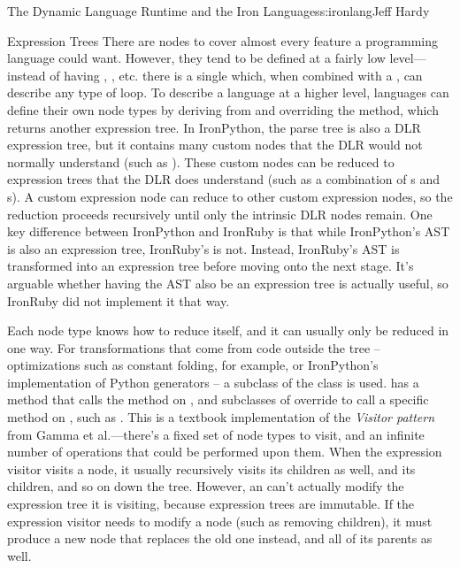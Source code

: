 \begin{aosachapter}{The Dynamic Language Runtime and the Iron Languages}{s:ironlang}{Jeff Hardy}
\begin{aosasect1}{Expression Trees}
There are nodes to cover almost every feature a programming language could
want. However, they tend to be defined at a fairly low level---instead of
having , , etc. there is a single
 which, when combined with a , can
describe any type of loop. To describe a language at a higher level, languages
can define their own node types by deriving from  and
overriding the  method, which returns another expression tree.
In IronPython, the parse tree is also a DLR expression tree, but it contains
many custom nodes that the DLR would not normally understand (such as
). These custom nodes can be reduced to expression trees
that the DLR does understand (such as a combination of s
and s). A custom expression node can reduce to other
custom expression nodes, so the reduction proceeds recursively until only the
intrinsic DLR nodes remain. One key difference between IronPython and IronRuby
is that while IronPython's AST is also an expression tree, IronRuby's is not.
Instead, IronRuby's AST is transformed into an expression tree before moving
onto the next stage. It's arguable whether having the AST also be an expression
tree is actually useful, so IronRuby did not implement it that way.

Each node type knows how to reduce itself, and it can usually only be reduced
in one way. For transformations that come from code outside the tree --
optimizations such as constant folding, for example, or IronPython's
implementation of Python generators -- a subclass of the
 class is used.  has a
 method that calls the  method on
, and subclasses of  override 
to call a specific  method on , such as
. This is a textbook implementation of the \emph{Visitor
pattern} from Gamma et al.---there's a fixed set of node types to visit, and an
infinite number of operations that could be performed upon them. When the
expression visitor visits a node, it usually recursively visits its children as
well, and its children, and so on down the tree. However, an
 can't actually modify the expression tree it is
visiting, because expression trees are immutable. If the expression visitor
needs to modify a node (such as removing children), it must produce a new node
that replaces the old one instead, and all of its parents as well.


\end{aosasect1}
\end{aosachapter}
